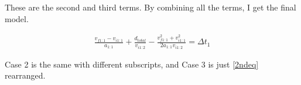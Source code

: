 \documentclass[11pt]{article}
\begin{document}
These are the second and third terms. By combining all the terms, I get the final model. 

\vspace{-0.5cm}
\begin{align*}
        \frac{v_{f1:1} - v_{i1:1}}{a_{1:1}} + \frac{d_{total}}{v_{i1:2}} - \frac{v_{f1:1}^2 + v_{i1:1}^2}{2a_{1:1}v_{i1:2}} = \Delta t_1
\end{align*}

Case 2 is the same with different subscripts, and Case 3 is just \eqref{2ndeq} rearranged.
\end{document}
